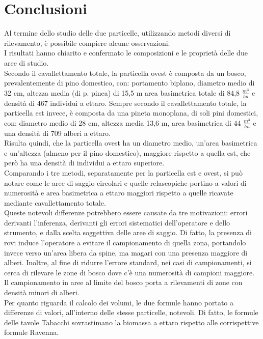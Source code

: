 \section{Conclusioni}
Al termine dello studio delle due particelle, utilizzando metodi diversi di rilevamento, è possibile compiere alcune osservazioni.\\
I risultati hanno chiarito e confermato le composizioni e le proprietà delle due aree di studio.\\ 
Secondo il cavallettamento totale, la particella ovest è composta da un bosco, prevalentemente di pino domestico, con: portamento biplano, diametro medio di 32 cm, altezza media (di p. pinea) di 15,5 m area basimetrica totale di 84,8 $\frac{m^3}{ha}$ e densità di 467 individui a ettaro. Sempre secondo il cavallettamento totale, la particella est invece, è composta da una pineta monoplana, di soli pini domestici, con: diametro medio di 28 cm, altezza media 13,6 m, area basimetrica di 44 $\frac{m^3}{ha}$ e una densità di 709 alberi a ettaro.\\ 
Risulta quindi, che la particella ovest ha un diametro medio, un'area basimetrica e un'altezza (almeno per il pino domestico), maggiore rispetto a quella est, che però ha una densità di individui a ettaro superiore.\\
Comparando i tre metodi, separatamente per la particella est e ovest, si può notare come le aree di saggio circolari e quelle relascopiche portino a valori di numerosità e area basimetrica a ettaro maggiori rispetto a quelle ricavate mediante cavallettamento totale.\\
Queste notevoli differenze potrebbero essere causate da tre motivazioni: errori derivanti l'inferenza, derivanti gli errori sistematici dell'operatore e dello strumento, e dalla scelta soggettiva delle aree di saggio. Di fatto, la presenza di rovi induce l'operatore a evitare il campionamento di quella zona, portandolo invece verso un'area libera da spine, ma magari con una presenza maggiore di alberi. Inoltre, al fine di ridurre l'errore standard, nei casi di campionamenti, si cerca di rilevare le zone di bosco dove c'è una numerosità di campioni maggiore. Il campionamento in aree al limite del bosco porta a rilevamenti di zone con densità minori di alberi.\\
Per quanto riguarda il calcolo dei volumi, le due formule hanno portato a differenze di valori, all'interno delle stesse particelle, notevoli. Di fatto, le formule delle tavole Tabacchi sovrastimano la biomassa a ettaro rispetto alle corrispettive formule Ravenna.\\ \\
